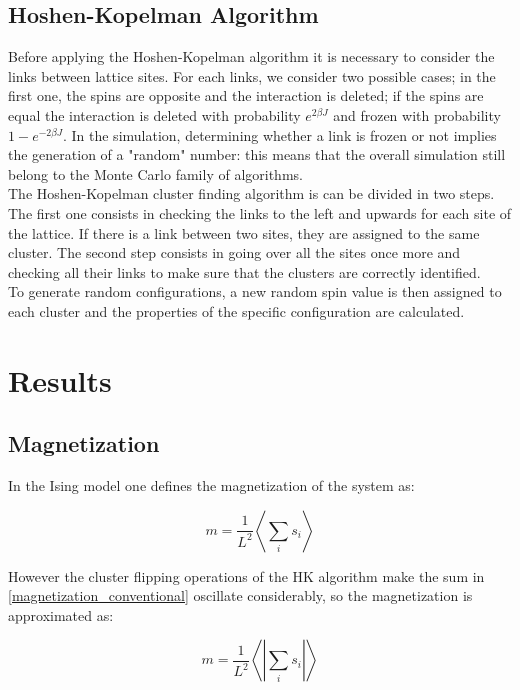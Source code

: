 \documentclass[twoside]{article}
\def\mean#1{\left< #1 \right>}
\begin{document}
\begin{multicols}{2}
\subsection{Hoshen-Kopelman Algorithm}
Before applying the Hoshen-Kopelman algorithm it is necessary to consider the links between lattice sites. For each links, we consider two possible cases; in the first one, the spins are opposite and the interaction is deleted; if the spins are equal the interaction is deleted with probability $e^{2\beta J}$ and frozen with probability $1-e^{-2\beta J}$.
In the simulation, determining whether a link is frozen or not implies the generation of a "random" number: this means that the overall simulation still belong to the Monte Carlo family of algorithms. \\
The Hoshen-Kopelman cluster finding algorithm is can be divided in two steps.
The first one consists in checking the links to the left and upwards for each site of the lattice. If there is a link between two sites, they are assigned to the same cluster. The second step consists in going over all the sites once more and checking all their links to make sure that the clusters are correctly identified. \\ To generate random configurations, a new random spin value is then assigned to each cluster and the properties of the specific configuration are calculated.

\section{Results}

\subsection{Magnetization}
In the Ising model one defines the magnetization of the system as:

\begin{equation}
m = \frac{1}{L^2} \mean{\sum_i s_i}
\label{magnetization_conventional}
\end{equation}

However the cluster flipping operations of the HK algorithm make the sum in \ref{magnetization_conventional} oscillate considerably, so the magnetization is approximated as:

\begin{equation}
m = \frac{1}{L^2} \mean{\left|\sum_i s_i\right|}
\end{equation}


\end{multicols}
\end{document}
